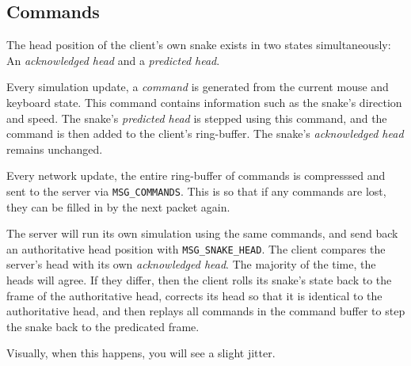 \subsection{Commands}

The  head  position  of   the   client's   own   snake  exists  in  two  states
simultaneously: An \emph{acknowledged head}  and  a \emph{predicted head}.

Every  simulation update, a \emph{command} is generated from the current  mouse
and  keyboard  state.  This  command  contains information such as the  snake's
direction and speed.  The  snake's  \emph{predicted head} is stepped using this
command, and the command is then added to the client's ring-buffer. The snake's
\emph{acknowledged head} remains unchanged.

Every  network  update, the entire ring-buffer of commands is  compresssed  and
sent to the server via \verb$MSG_COMMANDS$. This is so that if any commands are
lost, they can be filled in by the next packet again.

The server will  run  its own simulation using the same commands, and send back
an authoritative head position with \verb$MSG_SNAKE_HEAD$.  The client compares
the server's head with its own \emph{acknowledged head}. The  majority  of  the
time, the heads will agree. If  they  differ, then the client rolls its snake's
state back to the frame of the authoritative head, corrects its head so that it
is  identical to the authoritative head, and then replays all commands  in  the
command buffer to step the snake back to the predicated frame.

Visually, when this happens, you will see a slight jitter.



\vspace{1.5em}

\begin{figure}[H]

\end{figure}

\vspace{1.5em}

\begin{figure}[H]

\end{figure}
